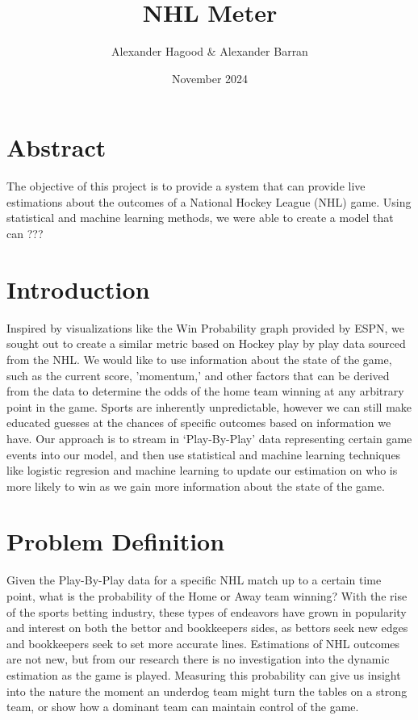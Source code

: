 \documentclass{article}
\title{NHL Meter}
\author{Alexander Hagood \& Alexander Barran}
\date{November 2024}
\begin{document}
\maketitle

\section{Abstract}
The objective of this project is to provide a system that can provide live estimations
about the outcomes of a National Hockey League (NHL) game. Using statistical and
machine learning methods, we were able to create a model that can ???
\section{Introduction}
Inspired by visualizations like the Win Probability graph provided by ESPN, we sought
out to create a similar metric based on Hockey play by play data sourced from the NHL.
We would like to use information about the state of the game, such as the current 
score, 'momentum,' and other factors that can be derived from the data to determine 
the odds of the home team winning at any arbitrary point in the game. Sports are 
inherently unpredictable, however we can still make educated guesses at the chances 
of specific outcomes based on information we have. Our approach is to stream in ‘Play-By-Play’ 
data representing certain game events into our model, and then use statistical and machine 
learning techniques like logistic regresion and machine learning to update our estimation on who
is more likely to win as we gain more information about the state of the game.


\section{Problem Definition}
Given the Play-By-Play data for a specific NHL match up to a certain time point, 
what is the probability of the Home or Away team winning? With the rise of the sports 
betting industry, these types of endeavors have grown in popularity and interest on 
both the bettor and bookkeepers sides, as bettors seek new edges and bookkeepers seek 
to set more accurate lines. Estimations of NHL outcomes are not new, but from our research 
there is no investigation into the dynamic estimation as the game is played. Measuring
this probability can give us insight into the nature the moment an underdog team might
turn the tables on a strong team, or show how a dominant team can maintain control of the game.
\end{document}
